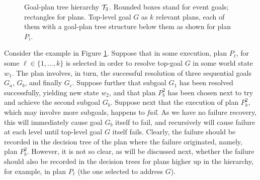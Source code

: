 \begin{figure}[t]
\begin{center}

\end{center}
\caption{Goal-plan tree hierarchy ${\mathcal{T}}_3$. Rounded boxes stand for event goals; rectangles for
plans. Top-level goal $G$ as $k$ relevant plans, each of them with a goal-plan
tree structure below them as shown for plan $P_i$.}
%
\label{fig:T3}
\end{figure}



Consider the example in Figure \ref{fig:T3}.
Suppose that in some execution, plan $P_\ell$, for some $\ell \in \{1,\ldots,k\}$
is selected in order to resolve top-goal $G$ in some world state $w_1$. The plan
involves, in turn, the successful resolution of three sequential goals $G_a$,
$G_b$, and finally $G_c$. Suppose further that subgoal $G_1$ has been resolved
successfully, yielding new state $w_2$, and that plan $P_b^2$ has been chosen
next to try and achieve the second subgoal $G_b$.
Suppose next that the execution of plan $P_b^2$, which may involve more subgoals,
happens to \emph{fail}. As we have no failure recovery, this will immediately
cause goal $G_b$ itself to fail, and recursively will cause failure at each level
until top-level goal $G$ itself fails.
Clearly, the failure should be recorded in the decision tree of the plan where
the failure originated, namely, plan $P_b^2$. However, it is not so clear, as
will be discussed next, whether the failure should also be recorded in the
decision trees for plans higher up in the hierarchy, for example, in plan
$P_\ell$ (the one selected to address $G$).


